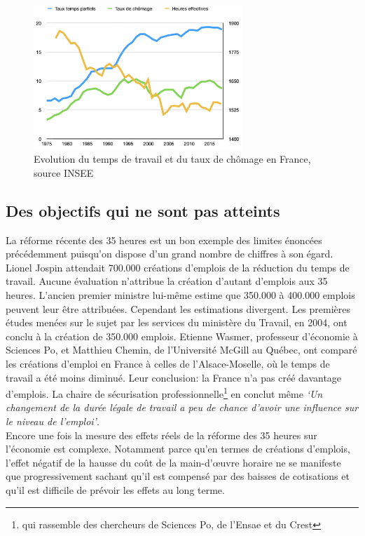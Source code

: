 \documentclass[main.tex]{subfiles}
\begin{document}
        \medskip
        \begin{figure}[htpb]
                \centering
                \includegraphics[width=0.7\textwidth]{temps_trav4.png}
                \caption{Evolution du temps de travail et du taux de chômage en France, source INSEE}
                \label{fig:temps_trav4}
        \end{figure}

        \subsection{Des objectifs qui ne sont pas atteints}

        La réforme récente des 35 heures est un bon exemple des limites énoncées précédemment puisqu'on dispose d'un grand nombre de chiffres à son égard.
        Lionel Jospin attendait 700.000 créations d'emplois de la réduction du temps de travail. Aucune évaluation n'attribue la création d'autant d'emplois aux 35 heures. L'ancien premier ministre lui-même estime que 350.000 à 400.000 emplois peuvent leur être attribuées. Cependant les estimations divergent. Les premières études menées sur le sujet par les services du ministère du Travail, en 2004, ont conclu à la création de 350.000 emplois. Etienne Wasmer, professeur d'économie à Sciences Po, et Matthieu Chemin, de l'Université McGill au Québec, ont comparé les créations d'emploi en France à celles de l'Alsace-Moselle, où le temps de travail a été moins diminué. Leur conclusion: la France n'a pas créé davantage d'emplois. La chaire de sécurisation professionnelle\footnote{qui rassemble des chercheurs de Sciences Po, de l'Ensae et du Crest} en conclut même \textit{`Un changement de la durée légale de travail a peu de chance d'avoir une influence sur le niveau de l'emploi'}. \\

        Encore une fois la mesure des effets réels de la réforme des 35 heures sur l'économie est complexe. Notamment parce qu'en termes de créations d'emplois, l'effet négatif de la hausse du coût de la main-d'œuvre horaire ne se manifeste que progressivement sachant qu'il est compensé par des baisses de cotisations et qu'il est difficile de prévoir les effets au long terme.\\
\end{document}
